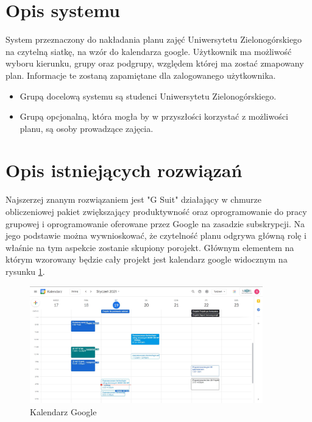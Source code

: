\documentclass[a4paper,11pt]{uzreport}
\author{
  Erwin Konkel\\
  Mateusz Znojek\\
  Stanisław Mól - Scrum Master\\
}
\date{19.01.2021}
\begin{document}
  \maketitle
  
\section{Opis systemu}
	System przeznaczony do nakładania planu zajęć Uniwersytetu Zielonogórskiego na czytelną siatkę, na wzór do kalendarza google. Użytkownik ma możliwość wyboru kierunku, grupy oraz podgrupy, względem której ma zostać zmapowany plan. Informacje te zostaną zapamiętane dla zalogowanego użytkownika.
    
    \begin{itemize}[leftmargin=0.50in]

        \item Grupą docelową systemu są studenci Uniwersytetu Zielonogórskiego.

	\item Grupą opcjonalną, która mogła by w przyszłości korzystać z możliwości planu, są osoby prowadzące zajęcia.

    \end{itemize}

\section{Opis istniejących rozwiązań}
	Najszerzej znanym rozwiązaniem jest "G Suit" działający w chmurze obliczeniowej pakiet zwiększający produktywność oraz oprogramowanie do pracy grupowej i oprogramowanie oferowane przez Google na zasadzie subskrypcji. Na jego podstawie można wywnioskować, że czytelność planu odgrywa główną rolę i właśnie na tym aspekcie zostanie skupiony porojekt. Głównym elementem na którym wzorowany będzie cały projekt jest kalendarz google widocznym na rysunku \ref{kalendarz_google_1}.\\

    \begin{figure}[ht!]
        \centering
        \includegraphics[width=0.9\textwidth]{pictures/Kalendarz-Google_1.jpg}
        \caption{Kalendarz Google}
        \label{kalendarz_google_1}
     \end{figure}
\end{document}
